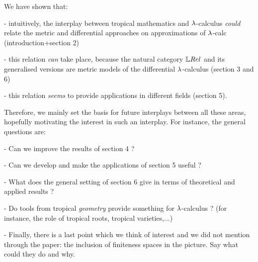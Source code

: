 We have shown that:

- intuitively, the interplay between tropical mathematics and $\lambda$-calculus \emph{could} relate the metric and differential approaches on approximations of $\lambda$-calc (introduction+section 2)

- this relation \emph{can} take place, because the natural category $\LREL$ and its generalised versions are metric models of the differential $\lambda$-calculus (section 3 and 6)

- this relation \emph{seems} to provide applications in different fields (section 5).

Therefore, we mainly set the basis for future interplays between all these areas, hopefully motivating the interest in such an interplay.
For instance, the general questions are:

- Can we improve the results of section 4 ?

- Can we develop and make the applications of section 5 useful ?

- What does the general setting of section 6 give in terms of theoretical and applied results ?

- Do tools from tropical \emph{geometry} provide something for $\lambda$-calculus ? (for instance, the role of tropical roots, tropical varieties,...)

- Finally, there is a last point which we think of interest and we did not mention through the paper: the inclusion of finiteness spaces in the picture.
Say what could they do and why.
